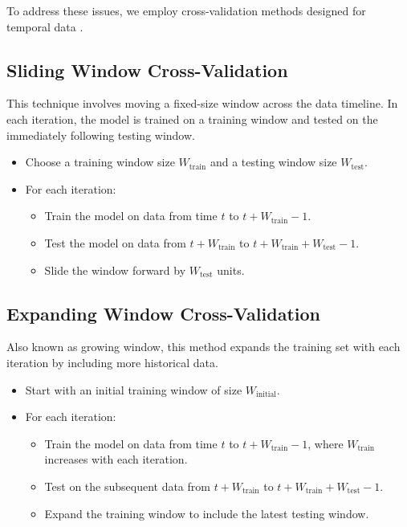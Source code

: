 To address these issues, we employ cross-validation methods designed for temporal data \cite{BergmeirEtAl2018}.

\subsection{Sliding Window Cross-Validation}

This technique involves moving a fixed-size window across the data timeline. In each iteration, the model is trained on a training window and tested on the immediately following testing window.

\begin{itemize}
    \item Choose a training window size \( W_{\text{train}} \) and a testing window size \( W_{\text{test}} \).
    \item For each iteration:
    \begin{itemize}
        \item Train the model on data from time \( t \) to \( t + W_{\text{train}} - 1 \).
        \item Test the model on data from \( t + W_{\text{train}} \) to \( t + W_{\text{train}} + W_{\text{test}} - 1 \).
        \item Slide the window forward by \( W_{\text{test}} \) units.
    \end{itemize}
\end{itemize}

\subsection{Expanding Window Cross-Validation}

Also known as growing window, this method expands the training set with each iteration by including more historical data.

\begin{itemize}
    \item Start with an initial training window of size \( W_{\text{initial}} \).
    \item For each iteration:
    \begin{itemize}
        \item Train the model on data from time \( t \) to \( t + W_{\text{train}} - 1 \), where \( W_{\text{train}} \) increases with each iteration.
        \item Test on the subsequent data from \( t + W_{\text{train}} \) to \( t + W_{\text{train}} + W_{\text{test}} - 1 \).
        \item Expand the training window to include the latest testing window.
    \end{itemize}
\end{itemize}


